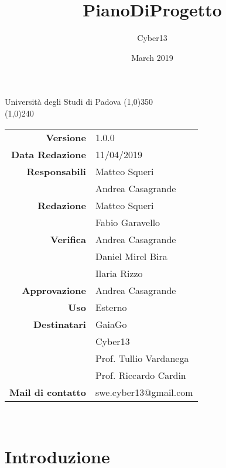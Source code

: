 \documentclass[a4paper, 12pt]{article}
\title{PianoDiProgetto}
\author{Cyber13}
\date{March 2019}
\begin{document}
	\begin{titlepage}
		\centering Università degli Studi di Padova
		\line(1,0){350}\\
		\vspace{1.2cm}
		\logo
		\vspace{1.0cm}
		\vspace{0.5cm}
		\vspace{0.5cm}
		\line(1,0){240}\\
		\begin{tabular}{r|l}
			{\textbf{Versione}} 			& 1.0.0\\
			{\textbf{Data Redazione}} 	& 11/04/2019\\	%
			{\textbf{Responsabili}} 	& Matteo Squeri\\ & Andrea Casagrande\\	%
			{\textbf{Redazione}} 		& Matteo Squeri \\ & Fabio Garavello \\
			{\textbf{Verifica}} 		 & Andrea Casagrande \\ & Daniel Mirel Bira \\ & Ilaria Rizzo\\
			{\textbf{Approvazione}} 	& Andrea Casagrande\\
			{\textbf{Uso}} 				& Esterno\\
			{\textbf{Destinatari}} 	& GaiaGo \\& Cyber13\\ & Prof. Tullio Vardanega\\ & Prof. Riccardo Cardin\\
			{\textbf{Mail di contatto}} 	& swe.cyber13@gmail.com\\
		\end{tabular}\\
	\end{titlepage}

	\newpage
		
	\newpage
		\tableofcontents
    \newpage
	    \listoftables
	\newpage
	    \listoffigures
    \newpage
        \section{Introduzione}
        
    \newpage
\end{document}
